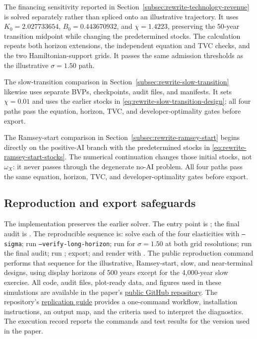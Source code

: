 The financing sensitivity reported in Section~\ref{subsec:rewrite-technology-revenue}
is solved separately rather than spliced onto an illustrative trajectory. It uses
$K_0=2.027733654$, $B_0=0.443670932$, and $\chi=1.4223$, preserving the
50-year transition midpoint while changing the predetermined stocks. The
calculation repeats both horizon extensions, the independent equation and TVC
checks, and the two Hamiltonian-support grids. It passes the same admission
thresholds as the illustrative $\sigma=1.50$ path.

The slow-transition comparison in
Section~\ref{subsec:rewrite-slow-transition} likewise uses separate BVPs,
checkpoints, audit files, and manifests. It sets $\chi=0.01$ and uses the
earlier stocks in \eqref{eq:rewrite-slow-transition-design}; all four paths
pass the equation, horizon, TVC, and developer-optimality gates before export.

The Ramsey-start comparison in
Section~\ref{subsec:rewrite-ramsey-start} begins directly on the positive-AI
branch with the predetermined stocks in
\eqref{eq:rewrite-ramsey-start-stocks}. The numerical continuation changes
those initial stocks, not $\omega_X$: it never passes through the degenerate
no-AI problem. All four paths pass the same equation, horizon, TVC, and
developer-optimality gates before export.

\subsection{Reproduction and export safeguards}

The implementation preserves the earlier solver. The entry point is
; the final audit is
. The reproducible sequence is:
solve each of the four elasticities with \texttt{--sigma}; run
\texttt{--verify-long-horizon}; run
 for $\sigma=1.50$ at both
grid resolutions; run the final audit; run
; export; and render with
. The public reproduction command performs
that sequence for the illustrative, Ramsey-start, slow, and near-terminal designs,
using display horizons of 500 years except for the 4,000-year slow exercise.
All code, audit files, plot-ready data, and figures used in these simulations
are available in the paper's
\href{https://github.com/oliverpardo1979/AI-Future-Paper-WTF}{public GitHub repository}.
The repository's
\href{https://github.com/oliverpardo1979/AI-Future-Paper-WTF/blob/main/REPLICATION.md}{replication guide}
provides a one-command workflow, installation instructions, an output map, and
the criteria used to interpret the diagnostics. The execution record
 reports the commands and test
results for the version used in the paper.

